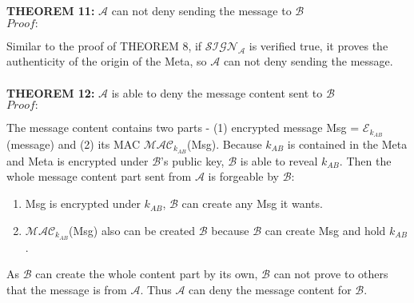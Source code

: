 \\
\\
\textbf{THEOREM 11:} $\mathcal{A}$ can not deny sending the message to $\mathcal{B}$\\
\emph{$Proof:$} \par
Similar to the proof of THEOREM 8, if $\mathcal{SIGN_A}$ is verified true, it proves the authenticity of the origin of the Meta, so $\mathcal{A}$ can not deny sending the message.
\\
\\
\textbf{THEOREM 12:} $\mathcal{A}$ is able to deny the message content sent to $\mathcal{B}$ \\
\emph{$Proof:$} \par
The message content contains two parts - (1) encrypted message Msg =  $\mathcal{E}_{k_{AB}}$(message) and (2) its MAC $\mathcal{MAC}_{k_{AB}}$(Msg). Because $k_{AB}$ is contained in the Meta and Meta is encrypted under $\mathcal{B}$'s public key, $\mathcal{B}$ is able to reveal $k_{AB}$. Then the whole message content part sent from $\mathcal{A}$ is forgeable by $\mathcal{B}$:
\begin{enumerate}
\item Msg is encrypted under $k_{AB}$, $\mathcal{B}$ can create any Msg it wants.
\item $\mathcal{MAC}_{k_{AB}}$(Msg) also can be created $\mathcal{B}$ because $\mathcal{B}$ can create Msg and hold $k_{AB}$.
\end{enumerate}
As $\mathcal{B}$ can create the whole content part by its own, $\mathcal{B}$ can not prove to others that the message is from $\mathcal{A}$. Thus $\mathcal{A}$ can deny the message content for $\mathcal{B}$.

